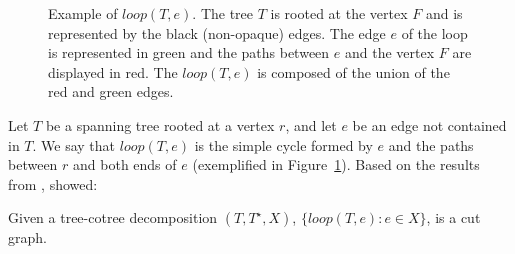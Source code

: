 \begin{figure}[H]
    \centering
{}
    \caption{Example of \(loop(T, e)\). The tree \(T\) is rooted at the vertex \(F\) and is represented by the black (non-opaque) edges. The edge \(e\) of the loop is represented in green and the paths between \(e\) and the vertex \(F\) are displayed in red. The \(loop(T, e)\) is composed of the union of the red and green edges.}
    \label{fig:loop_T_e}
\end{figure}


Let \(T\) be a spanning tree rooted at a vertex \(r\), and let \(e\) be an edge not contained in \(T\). We say that \(loop(T, e)\) is the simple cycle formed by \(e\) and the paths between \(r\) and both ends of \(e\) (exemplified in Figure~\ref{fig:loop_T_e}). Based on the results from \citeauthor{Eppstein}, \cite{Borradaile2012} showed:

\begin{lemma}
    Given a tree-cotree decomposition \((T, T^{\star}, X)\), \(\{loop(T, e): e \in X\}\), is a cut graph.
\end{lemma}

